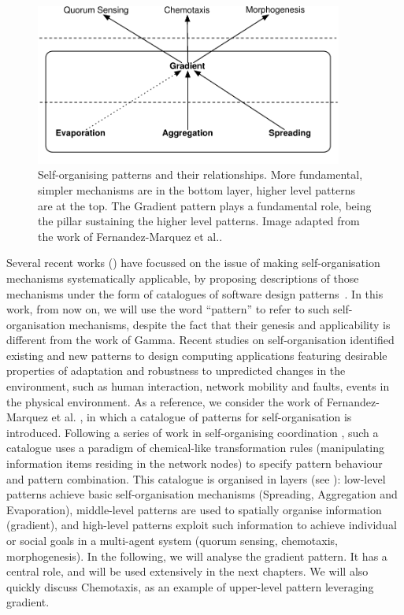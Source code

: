 \documentclass[12pt,a4paper,twoside,openright]{book}
\begin{document}
\begin{figure}
\begin{center}
	\includegraphics[width=0.9\textwidth]{img/sc-basic-mech.pdf}
\end{center}
\caption{Self-organising patterns and their relationships. More fundamental, simpler mechanisms are in the bottom layer, higher level patterns are at the top. The Gradient pattern plays a fundamental role, being the pillar sustaining the higher level patterns. Image adapted from the work of Fernandez-Marquez et al.\cite{biocore}.}
\label{fig:patterns} 
\end{figure}

Several recent works (\cite{FDMVA-NACO2012,GVO-CEEMAS2007,Mam06,Wolf2007}) have focussed on the issue of making self-organisation mechanisms systematically applicable, by proposing descriptions of those mechanisms under the form of catalogues of software design patterns~\cite{Gamma1995}.
%
In this work, from now on, we will use the word ``pattern'' to refer to such self-organisation mechanisms, despite the fact that their genesis and applicability is different from the work of Gamma.
%
Recent studies on self-organisation identified existing and new patterns to design computing applications featuring desirable properties of adaptation and robustness to unpredicted changes in the environment, such as human interaction, network mobility and faults, events in the physical environment.
%
As a reference, we consider the work of Fernandez-Marquez et al. \cite{FDMVA-NACO2012}, in which a catalogue of patterns for self-organisation is introduced.
%
Following a series of work in self-organising coordination \cite{VCMZ-TAAS2011,sapereecolaws-sac2012}, such a catalogue uses a paradigm of chemical-like transformation rules (manipulating information items residing in the network nodes) to specify pattern behaviour and pattern combination.
%
This catalogue is organised in layers (see ): low-level patterns achieve basic self-organisation mechanisms (Spreading, Aggregation and Evaporation), middle-level patterns are used to spatially organise information (gradient), and high-level patterns exploit such information to achieve individual or social goals in a multi-agent system (quorum sensing, chemotaxis, morphogenesis).
%
In the following, we will analyse the gradient pattern.
%
It has a central role, and will be used extensively in the next chapters.
%
We will also quickly discuss Chemotaxis, as an example of upper-level pattern leveraging gradient.
\end{document}
